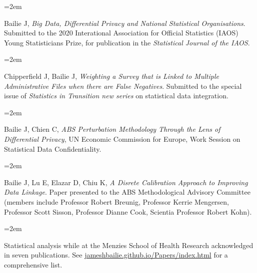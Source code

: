 \documentclass[DVI=12]{scrartcl}
\newcommand{\MarginText}[1]{\marginpar{\raggedleft\itshape\small#1}} %
\newlength{\datebox}\settowidth{\datebox}{Spring 2011} %
\newcommand{\NewEntry}[3]{\noindent\hangindent=2em\hangafter=0 \parbox{\datebox}{\small \textit{#1}}\hspace{1.5em} #2 #3 %
\vspace{0.5em}} %
\newcommand{\Description}[1]{\hangindent=2em\hangafter=0\noindent\raggedright\footnotesize{#1}\par\normalsize\vspace{1em}} %
\begin{document}
\begin{cv}{}
\vspace{1em} %


\vspace{1em}

\Description{\MarginText{2019}Bailie J, \emph{Big Data, Differential Privacy and National Statistical Organisations}.
Submitted to the 2020 Interational Association for Official Statistics (IAOS) Young Statisticians Prize, for publication in the \emph{Statistical Journal of the IAOS}.}

\Description{Chipperfield J, Bailie J, \emph{Weighting a Survey that is Linked to Multiple Administrative Files when there are False Negatives}. Submitted to the special issue of \emph{Statistics in Transition new series} on statistical data integration.}

\Description{Bailie J, Chien C, \emph{ABS Perturbation Methodology Through the Lens of Differential Privacy}, UN Economic Commission for Europe, Work Session on Statistical Data Confidentiality.}

\Description{Bailie J, Lu E, Elazar D, Chiu K, \emph{A Disrete Calibration Approach to Improving Data Linkage}. Paper presented to the ABS Methodological Advisory Committee (members include Professor Robert Breunig, Professor Kerrie Mengersen, Professor Scott Sisson, Professor Dianne Cook, Scientia Professor Robert Kohn).}

\Description{\MarginText{2014--2016}Statistical analysis while at the Menzies School of Health Research acknowledged in seven publications. See \href{https://jameshbailie.github.io/Papers/index.html}{jameshbailie.github.io/Papers/index.html} for a comprehensive list.}

%
%
%
%
%


\end{cv}
\end{document}
